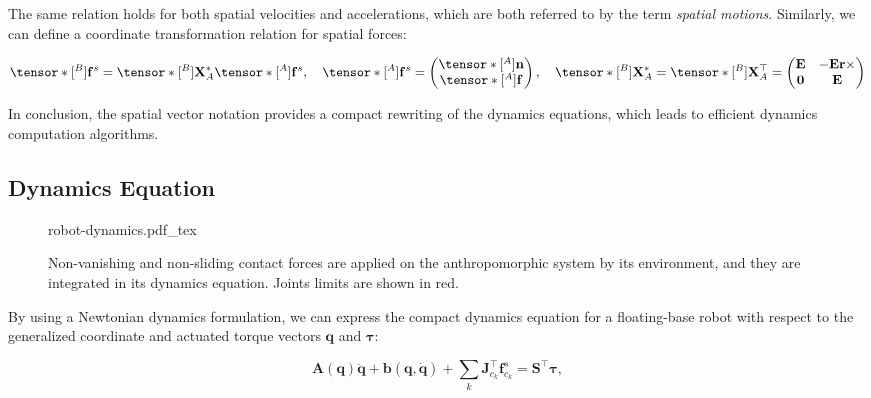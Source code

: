 The same relation holds for both spatial velocities and accelerations,
which are both referred to by the term \emph{spatial motions}.
Similarly, we can define a coordinate transformation relation for
spatial forces:

\begin{equation}
  \tensor*[^B]{\mathbf{f}}{^s}=
  \tensor*[^B]{\mathbf{X}}{^*_A}
  \tensor*[^A]{\mathbf{f}}{^s}
  ,\quad
  \tensor*[^A]{\mathbf{f}}{^s}=
  \left(\begin{matrix}
    \tensor*[^A]{\mathbf{n}}{}\\
    \tensor*[^A]{\mathbf{f}}{}
  \end{matrix}\right)
  ,\quad
  \tensor*[^B]{\mathbf{X}}{^*_A}=\tensor*[^B]{\mathbf{X}}{^\top_A}=
    \left(\begin{matrix}
    \mathbf{E} & -\mathbf{E}\mathbf{r}\times \\
    \mathbf{0} & \mathbf{E}
  \end{matrix}\right)
\end{equation}

In conclusion, the spatial vector notation provides a compact
rewriting of the dynamics equations, which leads to efficient dynamics
computation algorithms.

\subsection{Dynamics Equation}

\begin{figure}
  \centering
      {\def\svgwidth{0.4\linewidth}
        
                   {robot-dynamics.pdf_tex}
      }
      \caption{Non-vanishing and non-sliding contact forces are
        applied on the anthropomorphic system by its environment, and
        they are integrated in its dynamics equation. Joints limits
        are shown in red.}
      \label{fig:chap3-robot-dynamics}
\end{figure}

By using a Newtonian dynamics formulation, we can express the compact
dynamics equation for a floating-base robot with respect to the
generalized coordinate and actuated torque vectors $\mathbf{q}$ and
$\boldsymbol{\tau}$:

\begin{equation}
\label{dynamics-equation}
\mathbf{A}(\mathbf{q})\ddot{\mathbf{q}}
+\mathbf{b}(\mathbf{q},\dot{\mathbf{q}})
+\sum_k\mathbf{J}_{c_k}^\top\mathbf{f}^s_{c_k} =
\mathbf{S}^\top\boldsymbol{\tau},
\end{equation}

